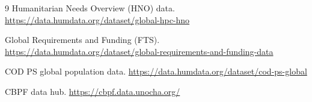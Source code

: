 \documentclass[11pt]{article}
\begin{document}
\begin{thebibliography}{9}
Humanitarian Needs Overview (HNO) data. \url{https://data.humdata.org/dataset/global-hpc-hno}

Global Requirements and Funding (FTS). \url{https://data.humdata.org/dataset/global-requirements-and-funding-data}

COD PS global population data. \url{https://data.humdata.org/dataset/cod-ps-global}

CBPF data hub. \url{https://cbpf.data.unocha.org/}
\end{thebibliography}
\end{document}
